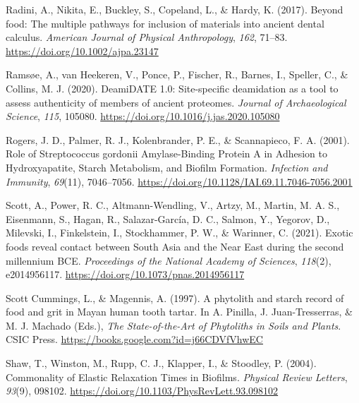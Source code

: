 \documentclass[
  letterpaper,
]{book}
\newlength{\cslhangindent}
\newlength{\cslentryspacingunit} %
\newenvironment{CSLReferences}[2] %
 {%
  \setlength{\parindent}{0pt}
  \ifodd #1
  \let\oldpar\par
  \def\par{\hangindent=\cslhangindent\oldpar}
  \fi
  \setlength{\parskip}{#2\cslentryspacingunit}
 }%
 {}
\begin{document}
\begin{CSLReferences}{1}{0}
\leavevmode{}%
Radini, A., Nikita, E., Buckley, S., Copeland, L., \& Hardy, K. (2017).
Beyond food: {The} multiple pathways for inclusion of materials into
ancient dental calculus. \emph{American Journal of Physical
Anthropology}, \emph{162}, 71--83.
\url{https://doi.org/10.1002/ajpa.23147}

\leavevmode{}%
Ramsøe, A., van Heekeren, V., Ponce, P., Fischer, R., Barnes, I.,
Speller, C., \& Collins, M. J. (2020). {DeamiDATE} 1.0: {Site-specific}
deamidation as a tool to assess authenticity of members of ancient
proteomes. \emph{Journal of Archaeological Science}, \emph{115}, 105080.
\url{https://doi.org/10.1016/j.jas.2020.105080}

\leavevmode{}%
Rogers, J. D., Palmer, R. J., Kolenbrander, P. E., \& Scannapieco, F. A.
(2001). Role of {Streptococcus} gordonii {Amylase-Binding Protein A} in
{Adhesion} to {Hydroxyapatite}, {Starch Metabolism}, and {Biofilm
Formation}. \emph{Infection and Immunity}, \emph{69}(11), 7046--7056.
\url{https://doi.org/10.1128/IAI.69.11.7046-7056.2001}

\leavevmode{}%
Scott, A., Power, R. C., Altmann-Wendling, V., Artzy, M., Martin, M. A.
S., Eisenmann, S., Hagan, R., Salazar-García, D. C., Salmon, Y.,
Yegorov, D., Milevski, I., Finkelstein, I., Stockhammer, P. W., \&
Warinner, C. (2021). Exotic foods reveal contact between {South Asia}
and the {Near East} during the second millennium {BCE}.
\emph{Proceedings of the National Academy of Sciences}, \emph{118}(2),
e2014956117. \url{https://doi.org/10.1073/pnas.2014956117}

\leavevmode{}%
Scott Cummings, L., \& Magennis, A. (1997). A phytolith and starch
record of food and grit in {Mayan} human tooth tartar. In A. Pinilla, J.
Juan-Tresserras, \& M. J. Machado (Eds.), \emph{The {State-of-the-Art}
of {Phytoliths} in {Soils} and {Plants}}. {CSIC Press}.
\url{https://books.google.com?id=j66CDVfVhwEC}

\leavevmode{}%
Shaw, T., Winston, M., Rupp, C. J., Klapper, I., \& Stoodley, P. (2004).
Commonality of {Elastic Relaxation Times} in {Biofilms}. \emph{Physical
Review Letters}, \emph{93}(9), 098102.
\url{https://doi.org/10.1103/PhysRevLett.93.098102}


\end{CSLReferences}
\end{document}
